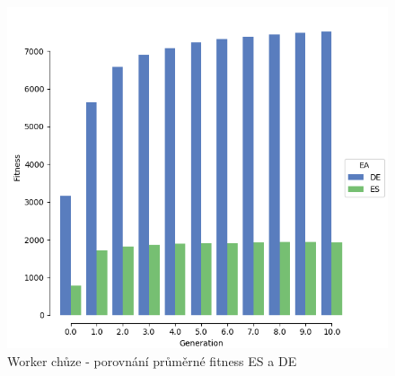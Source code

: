 	\begin{figure}[t]\centering
		\includegraphics[width=\columnwidth]{../img/WoodMap/DEvsES/WorkerWalkMem.png}
		\caption{Worker chůze - porovnání průměrné fitness ES a DE}
		\label{obr04:WWalkESvsDE}
	\end{figure}
